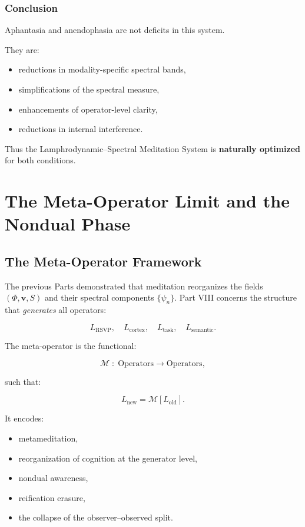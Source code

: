 \documentclass[12pt]{article}
\begin{document}
\section{Conclusion}

Aphantasia and anendophasia are not deficits in this system.

They are:

\begin{itemize}
    \item reductions in modality-specific spectral bands,
    \item simplifications of the spectral measure,
    \item enhancements of operator-level clarity,
    \item reductions in internal interference.
\end{itemize}

Thus the Lamphrodynamic–Spectral Meditation System is  
\textbf{naturally optimized} for both conditions.


\part{The Meta-Operator Limit and the Nondual Phase}

\chapter{The Meta-Operator Framework}

The previous Parts demonstrated that meditation reorganizes the fields
$(\Phi,\mathbf{v},S)$ and their spectral components $\{\psi_n\}$.
Part VIII concerns the structure that \emph{generates} all operators:

\[
L_{\text{RSVP}},\quad L_{\text{cortex}},\quad L_{\text{task}},\quad
L_{\text{semantic}}.
\]

The meta-operator is the functional:

\[
\mathcal{M} \;:\;
\text{Operators} \to \text{Operators},
\]

such that:

\[
L_{\text{new}} = \mathcal{M}[L_{\text{old}}].
\]

It encodes:

\begin{itemize}
    \item metameditation,
    \item reorganization of cognition at the generator level,
    \item nondual awareness,
    \item reification erasure,
    \item the collapse of the observer–observed split.
\end{itemize}
\end{document}
